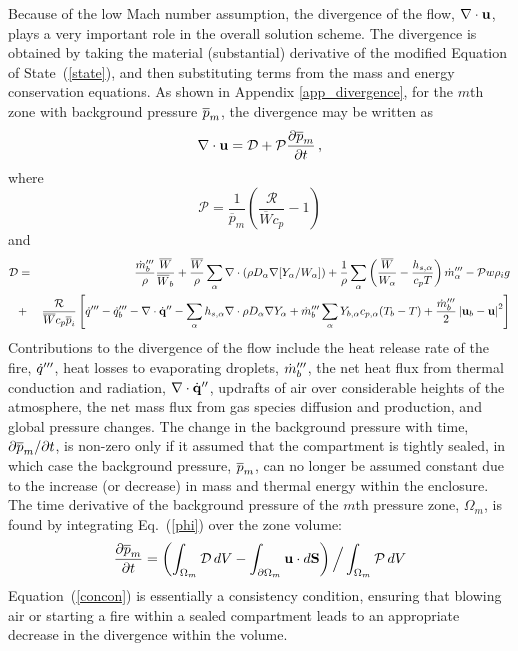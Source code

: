 \documentclass[11pt]{book}
\begin{document}
Because of the low Mach number assumption, the divergence of the flow, $\nabla \cdot {\bf u}$, plays a very important role in the overall solution scheme. The divergence is obtained by taking the material (substantial) derivative
of the modified Equation of State~(\ref{state}), and then substituting terms from the mass
and energy conservation equations. As shown in Appendix \ref{app_divergence}, for the $m$th zone with background pressure $\overline{p}_m$, the divergence may be written as
\begin{equation}
\label{eqn_divfromeos}
\nabla \cdot {\bf u} = {\cal D} + {\cal P}\frac{\partial \overline{p}_m}{\partial t} \,\mbox{,}  \label{phi}
\end{equation}
where
\begin{equation}
\label{eqn_fdsP1}
\mathcal{P} = \frac{1}{\overline{p}_m}\left( \frac{\mathcal{R}}{\overline{W} c_p} - 1 \right)
\end{equation}
and
\begin{eqnarray}
\label{eqn_fdsD1}
\mathcal{D} &=& \frac{\dot{m}_b^\tripleprime}{\rho}\frac{\overline{W}}{\overline{W}_b} + \frac{\overline{W}}{\rho} \sum_\alpha \Div \left( \rho D_\alpha \nabla[Y_\alpha/W_\alpha] \right) + \frac{1}{\rho}\sum_\alpha \left( \frac{\overline{W}}{W_\alpha} - \frac{h_{s,\alpha}}{c_p T} \right) \dot{m}_{\alpha}^\tripleprime  - \mathcal{P} w \rho_i g \nonumber \vspace{0.3cm} \\
&+& \frac{\mathcal{R}}{\overline{W} c_p \overline{p}_i} \left[ \dot{q}^\tripleprime - \dq_b''' - \Div \dot{\mathbf{q}}^{\prime\prime} - \sum_\alpha h_{s,\alpha} \Div \rho D_\alpha \nabla Y_\alpha + \dot{m}_{b}^{\tripleprime} \sum_\alpha Y_{b,\alpha} c_{p,\alpha}(T_b-T) + \frac{\dot{m}_{b}^{\tripleprime}}{2}\left|\mathbf{u}_b-\mathbf{u}\right|^2  \right] \nonumber \vspace{0.3cm} \\
\end{eqnarray}
Contributions to the divergence of the flow include the heat release rate of the fire, $\dot{q}'''$, heat losses to evaporating droplets, $\dot{m}_b'''$, the net heat flux from thermal conduction and radiation, $\nabla \cdot \dot{\bf q}''$, updrafts of air over considerable heights of the atmosphere, the net mass flux from gas species diffusion and production, and global pressure changes. The change in the background pressure with time, $\partial \overline{p}_m/\partial t$, is non-zero only if it assumed that the compartment is tightly sealed, in which case the background pressure, $\overline{p}_m$, can no longer be assumed constant due to the increase (or decrease) in mass and thermal energy within the enclosure. The time derivative of the background pressure of the $m$th pressure zone, $\Omega_m$, is found by integrating Eq.~(\ref{phi}) over the zone volume:
\begin{equation}
\frac{\partial \overline{p}_m}{\partial t} = \left( \int_{\Omega_m} {\cal D} \, dV - \int_{\partial \Omega_m} {\bf u} \cdot d{\bf S} \right) \Big/ \int_{\Omega_m} {\cal P} \, dV  \label{concon}
\end{equation}
Equation~(\ref{concon}) is essentially a consistency condition, ensuring that blowing air or starting a fire within a sealed
compartment leads to an appropriate decrease in the divergence within the volume.
\end{document}
